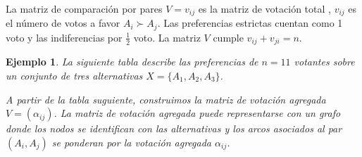 \documentclass[a5paper,doc,10pt,noapacite]{apa6}
\newtheorem{ejem}{Ejemplo}
\begin{document}
{{La matriz de comparación por pares \(V = v_{ij}\) es la matriz de votación total \cite{Levin-1995}, \(v_{ij}\) es el número de votos a favor \(A_i \succ A_j\). 
Las preferencias estrictas cuentan como 1 voto y las indiferencias por \(\frac{1}{2}\) voto. La matriz \(V\) cumple \(v_{ij} + v_{ji} = n \).


\begin{ejem}

La siguiente tabla describe las preferencias de \(n = 11\) votantes sobre un conjunto de tres alternativas \(X = \{A_1, A_2, A_3\}\).

\vspace{1\baselineskip}
A partir de la tabla suguiente, construimos la matriz de votación agregada \(V = (\alpha_{ij})\). La matriz de votación agregada puede representarse con un grafo donde los nodos se identifican con las alternativas y los arcos asociados al par \((A_i, A_j)\) se ponderan por la votación agregada \(\alpha_{ij}\). 


%
%
\begin{figure}[H]
\begin{floatrow}
	\fontsize{7}{11}\selectfont
	\captionsetup{justification=centering, labelfont=footnotesize, font=footnotesize}
\end{floatrow}
\end{figure}



\end{ejem}}}
\end{document}
